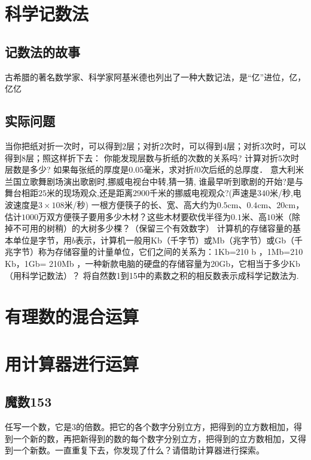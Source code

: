 \documentclass{article}
\begin{document}
\section{科学记数法}

  \subsection{记数法的故事}
    古希腊的著名数学家、科学家阿基米德也列出了一种大数记法，是“亿”进位，亿，亿亿
  \subsection{实际问题}


    \numa 当你把纸对折一次时，可以得到$2$层；对折$2$次时，可以得到$4$层；对折$3$次时，可以得到$8$层；照这样折下去：
      \numaa 你能发现层数与折纸的次数的关系吗?
      \numaa 计算对折$5$次时层数是多少?
      \numaa 如果每张纸的厚度是$0.05$毫米，求对折$l0$次后纸的总厚度．
    \numa 意大利米兰国立歌舞剧场演出歌剧时,挪威电视台中转,猜一猜, 谁最早听到歌剧的开始?是与舞台相距$25$米的现场观众,还是距离$2900$千米的挪威电视观众?(声速是$340$米/秒,电波速度是$3×108$米/秒)
    \numa  一根方便筷子的长、宽、高大约为$0.5$cm、$0.4$cm、$20$cm，估计$1000$万双方便筷子要用多少木材？这些木材要砍伐半径为$0.1$米、高$10$米（除掉不可用的树稍）的大树多少棵？（保留三个有效数字） 
    \numa 计算机的存储容量的基本单位是字节，用$b$表示，计算机一般用Kb（千字节）或Mb（兆字节）或Gb（千兆字节）称为存储容量的计量单位，它们之间的关系为：1Kb=210 b ，1Mb=210  Kb，1Gb= 210Mb ，一种新款电脑的硬盘的存储容量为20Gb，它相当于多少Kb（用科学记数法）？
    \numa 将自然数1到15中的素数之积的相反数表示成科学记数法为\lines.


\section{有理数的混合运算}

\section{用计算器进行运算}
  \subsection{魔数153}
    任写一个数，它是3的倍数。把它的各个数字分别立方，把得到的立方数相加，得到一个新的数，再把新得到的数的每个数字分别立方，把得到的立方数相加，又得到一个新数。一直重复下去，你发现了什么？请借助计算器进行探索。

\section{}
\end{document}

